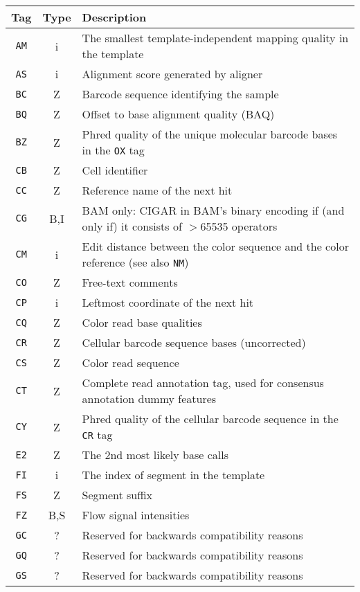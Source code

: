 \documentclass[10pt]{article}
\begin{document}
\begin{center}\small
\begin{longtable}{ccp{12.5cm}}
  \hline
  {\bf Tag} & {\bf Type} & {\bf Description} \\
  \hline
  {\tt AM} & i & The smallest template-independent mapping quality in the template \\
  {\tt AS} & i & Alignment score generated by aligner \\
  {\tt BC} & Z & Barcode sequence identifying the sample \\
  {\tt BQ} & Z & Offset to base alignment quality (BAQ) \\
  {\tt BZ} & Z & Phred quality of the unique molecular barcode bases in the {\tt OX} tag \\
  {\tt CB} & Z & Cell identifier \\
  {\tt CC} & Z & Reference name of the next hit \\
  {\tt CG} & B,I & BAM only: {\sf CIGAR} in BAM's binary encoding if (and only if) it consists of $>$65535 operators \\
  {\tt CM} & i & Edit distance between the color sequence and the color reference (see also {\tt NM}) \\
  {\tt CO} & Z & Free-text comments \\
  {\tt CP} & i & Leftmost coordinate of the next hit \\
  {\tt CQ} & Z & Color read base qualities \\
  {\tt CR} & Z & Cellular barcode sequence bases (uncorrected) \\
  {\tt CS} & Z & Color read sequence \\
  {\tt CT} & Z & Complete read annotation tag, used for consensus annotation dummy features \\
  {\tt CY} & Z & Phred quality of the cellular barcode sequence in the {\tt CR} tag \\
  {\tt E2} & Z & The 2nd most likely base calls \\
  {\tt FI} & i & The index of segment in the template \\
  {\tt FS} & Z & Segment suffix \\
  {\tt FZ} & B,S & Flow signal intensities \\
  {\tt GC} & ? & Reserved for backwards compatibility reasons \\
  {\tt GQ} & ? & Reserved for backwards compatibility reasons \\
  {\tt GS} & ? & Reserved for backwards compatibility reasons \\

\end{longtable}
\end{center}
\end{document}
